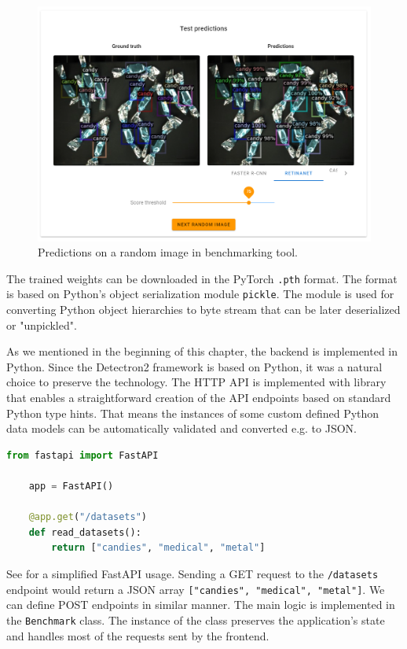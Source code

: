 \begin{figure}[ht]
    \includegraphics[width=\linewidth]{Sources/Figures/eval_random_image_.png}
    \caption{Predictions on a random image in benchmarking tool.}
    \label{fig:random-inference}
\end{figure}

The trained weights can be downloaded in the PyTorch \texttt{.pth} format. The
format is based on Python's object serialization module \texttt{pickle}. The
module is used for converting Python object hierarchies to byte stream that can
be later deserialized or "unpickled".

As we mentioned in the beginning of this chapter, the backend is implemented in
Python. Since the Detectron2 framework is based on Python, it was a natural
choice to preserve the technology. The HTTP API is implemented with
 library that enables a straightforward creation of the API
endpoints based on standard Python type hints. That means the instances of some
custom defined Python data models can be automatically validated and converted
e.g. to JSON.
\newpage
\begin{lstlisting}[language=python, caption=Simplified FastAPI example]
    from fastapi import FastAPI

    app = FastAPI()

    @app.get("/datasets")
    def read_datasets():
        return ["candies", "medical", "metal"]
\end{lstlisting}
\label{code:fastapi}

See  for a simplified FastAPI usage.
Sending a GET request to the \texttt{/datasets} endpoint would return a JSON
array \texttt{["candies", "medical", "metal"]}. We can define POST endpoints in
similar manner. The main logic is implemented in the \texttt{Benchmark} class.
The instance of the class preserves the application's state and handles most of
the requests sent by the frontend.

